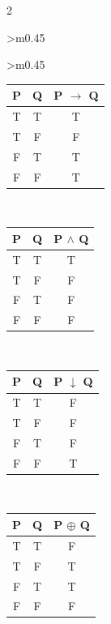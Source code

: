 \begin{multicols}{2}
\begin{tabular}{>{\centering\arraybackslash}m{0.45\textwidth}}
\end{tabular}


\begin{tabular}{>{\centering\arraybackslash}m{0.45\textwidth}}

\begin{minipage}[c][12em][c]{\linewidth}
\centering
{}
\begin{tabular}{|c|c|c|}
\hline
\textbf{P} & \textbf{Q} & \textbf{P $\to$ Q} \\ \hline
T & T & T \\ \hline
T & F & F \\ \hline
F & T & T \\ \hline
F & F & T \\ \hline
\end{tabular}
\end{minipage}
\\

\begin{minipage}[c][12em][c]{\linewidth}
\centering
{}
\begin{tabular}{|c|c|c|}
\hline
\textbf{P} & \textbf{Q} & \textbf{P $\land$ Q} \\ \hline
T & T & T \\ \hline
T & F & F \\ \hline
F & T & F \\ \hline
F & F & F \\ \hline
\end{tabular}
\end{minipage}
\\

\begin{minipage}[c][12em][c]{\linewidth}
\centering
{}
\begin{tabular}{|c|c|c|}
\hline
\textbf{P} & \textbf{Q} & \textbf{P $\downarrow$ Q} \\ \hline
T & T & F \\ \hline
T & F & F \\ \hline
F & T & F \\ \hline
F & F & T \\ \hline
\end{tabular}
\end{minipage}
\\

\begin{minipage}[c][12em][c]{\linewidth}
\centering
{}
\begin{tabular}{|c|c|c|}
\hline
\textbf{P} & \textbf{Q} & \textbf{P $\oplus$ Q} \\ \hline
T & T & F \\ \hline
T & F & T \\ \hline
F & T & T \\ \hline
F & F & F \\ \hline
\end{tabular}
\end{minipage}
\\


\end{tabular}
\end{multicols}
